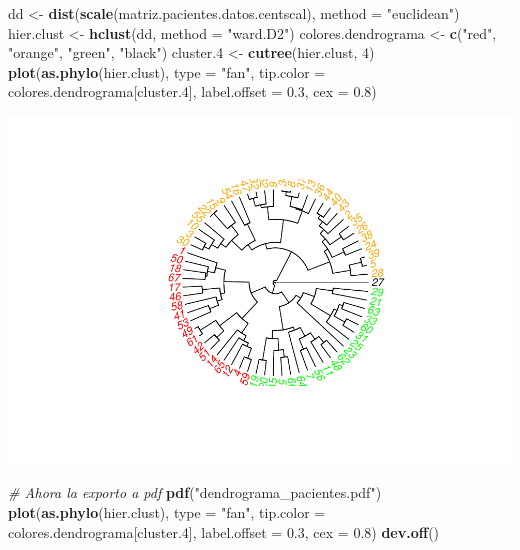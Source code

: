 \documentclass[]{article}
\newenvironment{Shaded}{\begin{snugshade}}{\end{snugshade}}
\newcommand{\KeywordTok}[1]{\textcolor[rgb]{0.13,0.29,0.53}{\textbf{#1}}}
\newcommand{\DataTypeTok}[1]{\textcolor[rgb]{0.13,0.29,0.53}{#1}}
\newcommand{\DecValTok}[1]{\textcolor[rgb]{0.00,0.00,0.81}{#1}}
\newcommand{\FloatTok}[1]{\textcolor[rgb]{0.00,0.00,0.81}{#1}}
\newcommand{\StringTok}[1]{\textcolor[rgb]{0.31,0.60,0.02}{#1}}
\newcommand{\CommentTok}[1]{\textcolor[rgb]{0.56,0.35,0.01}{\textit{#1}}}
\newcommand{\NormalTok}[1]{#1}
\begin{document}
\begin{Shaded}
\begin{Highlighting}[]
\NormalTok{dd <-}\StringTok{ }\KeywordTok{dist}\NormalTok{(}\KeywordTok{scale}\NormalTok{(matriz.pacientes.datos.centscal), }\DataTypeTok{method =} \StringTok{"euclidean"}\NormalTok{)}
\NormalTok{hier.clust <-}\StringTok{ }\KeywordTok{hclust}\NormalTok{(dd, }\DataTypeTok{method =} \StringTok{"ward.D2"}\NormalTok{)}
\NormalTok{colores.dendrograma <-}\StringTok{ }\KeywordTok{c}\NormalTok{(}\StringTok{"red"}\NormalTok{, }\StringTok{"orange"}\NormalTok{, }\StringTok{"green"}\NormalTok{, }\StringTok{"black"}\NormalTok{)}
\NormalTok{cluster.}\DecValTok{4}\NormalTok{ <-}\StringTok{ }\KeywordTok{cutree}\NormalTok{(hier.clust, }\DecValTok{4}\NormalTok{)}
\KeywordTok{plot}\NormalTok{(}\KeywordTok{as.phylo}\NormalTok{(hier.clust), }\DataTypeTok{type =} \StringTok{"fan"}\NormalTok{, }\DataTypeTok{tip.color =}\NormalTok{ colores.dendrograma[cluster.}\DecValTok{4}\NormalTok{], }\DataTypeTok{label.offset =} \FloatTok{0.3}\NormalTok{, }\DataTypeTok{cex =} \FloatTok{0.8}\NormalTok{)}
\end{Highlighting}
\end{Shaded}

\includegraphics{codigo_files/figure-latex/creacion_clusters_dendrograma_centradoEscalado-1.pdf}

\begin{Shaded}
\begin{Highlighting}[]
\CommentTok{# Ahora la exporto a pdf}
\KeywordTok{pdf}\NormalTok{(}\StringTok{"dendrograma_pacientes.pdf"}\NormalTok{)}
\KeywordTok{plot}\NormalTok{(}\KeywordTok{as.phylo}\NormalTok{(hier.clust), }\DataTypeTok{type =} \StringTok{"fan"}\NormalTok{, }\DataTypeTok{tip.color =}\NormalTok{ colores.dendrograma[cluster.}\DecValTok{4}\NormalTok{], }\DataTypeTok{label.offset =} \FloatTok{0.3}\NormalTok{, }\DataTypeTok{cex =} \FloatTok{0.8}\NormalTok{)}
\KeywordTok{dev.off}\NormalTok{()}
\end{Highlighting}
\end{Shaded}
\end{document}
